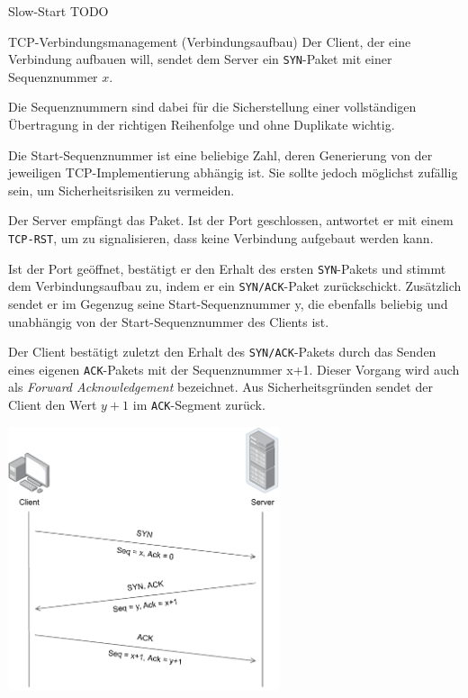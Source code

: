 \begin{bonus}{Slow-Start}
    TODO
\end{bonus}

\begin{defi}{TCP-Verbindungsmanagement (Verbindungsaufbau)}
    Der Client, der eine Verbindung aufbauen will, sendet dem Server ein \texttt{SYN}-Paket mit einer Sequenznummer $x$.

    Die Sequenznummern sind dabei für die Sicherstellung einer vollständigen Übertragung in der richtigen Reihenfolge und ohne Duplikate wichtig.

    Die Start-Sequenznummer ist eine beliebige Zahl, deren Generierung von der jeweiligen TCP-Implementierung abhängig ist.
    Sie sollte jedoch möglichst zufällig sein, um Sicherheitsrisiken zu vermeiden.

    Der Server empfängt das Paket. Ist der Port geschlossen, antwortet er mit einem \texttt{TCP-RST}, um zu signalisieren, dass keine Verbindung aufgebaut werden kann.

    Ist der Port geöffnet, bestätigt er den Erhalt des ersten \texttt{SYN}-Pakets und stimmt dem Verbindungsaufbau zu, indem er ein \texttt{SYN/ACK}-Paket zurückschickt.
    Zusätzlich sendet er im Gegenzug seine Start-Sequenznummer y, die ebenfalls beliebig und unabhängig von der Start-Sequenznummer des Clients ist.

    Der Client bestätigt zuletzt den Erhalt des \texttt{SYN/ACK}-Pakets durch das Senden eines eigenen \texttt{ACK}-Pakets mit der Sequenznummer x+1. Dieser Vorgang wird auch als \emph{Forward Acknowledgement} bezeichnet.
    Aus Sicherheitsgründen sendet der Client den Wert $y+1$ im \texttt{ACK}-Segment zurück.

    \centering
    \includegraphics[width=0.6\textwidth]{includes/figures/defi_tcp_verbindungsaufbau.pdf}
\end{defi}

